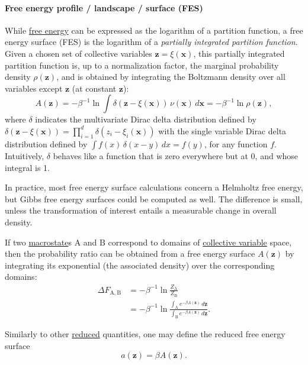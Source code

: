 \documentclass[9pt,review]{livecoms}
\newcommand{\vx}{\mathbf{x}}
\newcommand{\vz}{\mathbf{z}}
\newcommand{\A}{\mathrm{A}}
\newcommand{\B}{\mathrm{B}}
\begin{document}
\hypertarget{ref:FES} {\paragraph{Free energy profile / landscape / surface (FES)}}
\label{sec:FES}
While \hyperlink{ref:FE} {free energy} can be expressed as the logarithm of a partition function, a free energy surface (FES) is the logarithm of a \textit{partially integrated partition function}.
Given a chosen set of collective variables $\vz = \xi(\vx)$, this partially integrated partition function is, up to a normalization factor, the marginal probability density $\rho(\vz)$, and is obtained by integrating the Boltzmann density over all variables except $\vz$ (at constant $\vz$):
\begin{equation}
\label{eq:fes_definition}
    A(\vz) = -\beta^{-1} \ln \int
    \delta\left(\vz-\xi(\vx)\right) \, \nu(\vx)\, d\vx
    = -\beta^{-1} \ln \rho(\vz) ,
\end{equation}
where $\delta$ indicates the multivariate Dirac delta distribution defined by $\delta\left(\vz-\xi(\vx)\right)= \prod_{i=1}^{d} \delta\left(z_i-\xi_i(\vx)\right)$ with the single variable Dirac delta distribution defined by $\int f(x) \, \delta(x-y) \,  dx = f(y)$, for any function $f$. Intuitively, $\delta$ behaves like a function that is zero everywhere but at 0, and whose integral is 1.

In practice, most free energy surface calculations concern a Helmholtz free energy, but Gibbs free energy surfaces could be computed as well. The difference is small, unless the transformation of interest entails a measurable change in overall density.

If two \hyperlink{ref:Macrostate} {macrostate}s $\A$ and $\B$ correspond to domains of \hyperlink{ref:CV} {collective variable} space, then the probability ratio can be obtained from a free energy surface $A(\vz)$ by integrating its exponential (the associated density) over the corresponding domains:
\begin{align}
  \Delta F_{\A,\B} &=
  -\beta^{-1} \ln \frac{Z_\A}{Z_\B}\\
  & =  -\beta^{-1} \ln
  \frac{\int_\A e^{-\beta A(\vz)} \, d\vz}
  {\int_\B e^{-\beta A(\vz)} \, d\vz}.
\end{align}

Similarly to other \hyperlink{ref:reduced} {reduced} quantities, one may define the reduced free energy surface
\begin{equation}
    a(\vz) = \beta A(\vz).
\end{equation}
\end{document}
